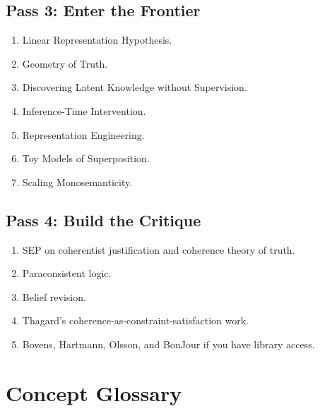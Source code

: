 \documentclass[11pt]{article}
\begin{document}
\subsection{Pass 3: Enter the Frontier}

\begin{enumerate}
\item Linear Representation Hypothesis.
\item Geometry of Truth.
\item Discovering Latent Knowledge without Supervision.
\item Inference-Time Intervention.
\item Representation Engineering.
\item Toy Models of Superposition.
\item Scaling Monosemanticity.
\end{enumerate}

\subsection{Pass 4: Build the Critique}

\begin{enumerate}
\item SEP on coherentist justification and coherence theory of truth.
\item Paraconsistent logic.
\item Belief revision.
\item Thagard's coherence-as-constraint-satisfaction work.
\item Bovens, Hartmann, Olsson, and BonJour if you have library access.
\end{enumerate}

\section{Concept Glossary}
\end{document}
